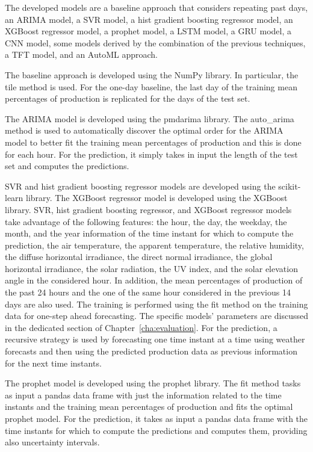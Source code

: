 The developed models are a baseline approach that considers repeating past days, an ARIMA model, a SVR model, a hist gradient boosting regressor model, an XGBoost regressor model, a prophet model, a LSTM model, a GRU model, a CNN model, some models derived by the combination of the previous techniques, a TFT model, and an AutoML approach.

The baseline approach is developed using the NumPy library.
In particular, the tile method is used.
For the one-day baseline, the last day of the training mean percentages of production is replicated for the days of the test set.

The ARIMA model is developed using the pmdarima library.
The auto\_arima method is used to automatically discover the optimal order for the ARIMA model to better fit the training mean percentages of production and this is done for each hour.
For the prediction, it simply takes in input the length of the test set and computes the predictions.

SVR and hist gradient boosting regressor models are developed using the scikit-learn library.
The XGBoost regressor model is developed using the XGBoost library.
SVR, hist gradient boosting regressor, and XGBoost regressor models take advantage of the following features: the hour, the day, the weekday, the month, and the year information of the time instant for which to compute the prediction, the air temperature, the apparent temperature, the relative humidity, the diffuse horizontal irradiance, the direct normal irradiance, the global horizontal irradiance, the solar radiation, the UV index, and the solar elevation angle in the considered hour.
In addition, the mean percentages of production of the past 24 hours and the one of the same hour considered in the previous 14 days are also used.
The training is performed using the fit method on the training data for one-step ahead forecasting.
The specific models' parameters are discussed in the dedicated section of Chapter~\ref{cha:evaluation}.
For the prediction, a recursive strategy is used by forecasting one time instant at a time using weather forecasts and then using the predicted production data as previous information for the next time instants.

The prophet model is developed using the prophet library.
The fit method tasks as input a pandas data frame with just the information related to the time instants and the training mean percentages of production and fits the optimal prophet model.
For the prediction, it takes as input a pandas data frame with the time instants for which to compute the predictions and computes them, providing also uncertainty intervals.

